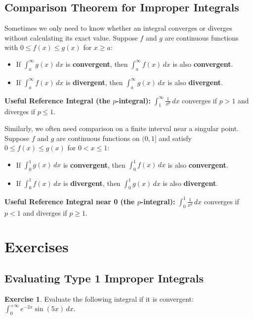 \documentclass[11pt]{article}
\theoremstyle{definition}
\newtheorem{exercise}{Exercise}[section]
\begin{document}
\subsection{Comparison Theorem for Improper Integrals}
Sometimes we only need to know whether an integral converges or diverges without calculating its exact value. Suppose $f$ and $g$ are continuous functions with $0 \le f(x) \le g(x)$ for $x \ge a$:
\begin{itemize}
    \item If $\displaystyle \int_a^{\infty} g(x)\,dx$ is \textbf{convergent}, then $\displaystyle \int_a^{\infty} f(x)\,dx$ is also \textbf{convergent}.
    \item If $\displaystyle \int_a^{\infty} f(x)\,dx$ is \textbf{divergent}, then $\displaystyle \int_a^{\infty} g(x)\,dx$ is also \textbf{divergent}.
\end{itemize}
\textbf{Useful Reference Integral (the $p$-integral):} 
$\displaystyle \int_1^{\infty} \frac{1}{x^p} \,dx$ converges if $p > 1$ and diverges if $p \le 1$.

Similarly, we often need comparison on a finite interval near a singular point. Suppose $f$ and $g$ are continuous functions on $(0,1]$ and satisfy $0 \le f(x) \le g(x)$ for $0 < x \le 1$:
\begin{itemize}
    \item If $\displaystyle \int_0^{1} g(x)\,dx$ is \textbf{convergent}, then $\displaystyle \int_0^{1} f(x)\,dx$ is also \textbf{convergent}.
    \item If $\displaystyle \int_0^{1} f(x)\,dx$ is \textbf{divergent}, then $\displaystyle \int_0^{1} g(x)\,dx$ is also \textbf{divergent}.
\end{itemize}
\textbf{Useful Reference Integral near 0 (the $p$-integral):}
$\displaystyle \int_0^{1} \frac{1}{x^p} \,dx$ converges if $p < 1$ and diverges if $p \ge 1$.

\section{Exercises}

\subsection{Evaluating Type 1 Improper Integrals}

\begin{exercise}
Evaluate the following integral if it is convergent: $\displaystyle \int_0^{+\infty} e^{-2x}\sin(5x)\,dx$.
\end{exercise}
\end{document}
